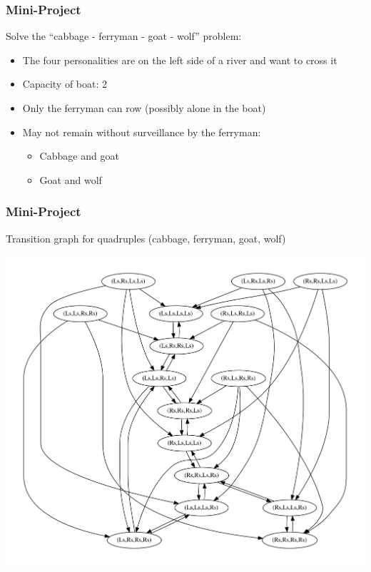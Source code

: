 \begin{frame}[fragile]\frametitle{Mini-Project}

  Solve the ``cabbage - ferryman - goat - wolf'' problem:
  \begin{itemize}
  \item The four personalities are on the left side of a river and want to
    cross it
  \item Capacity of boat: 2
  \item Only the ferryman can row (possibly alone in the boat)
  \item May not remain without surveillance by the ferryman:
    \begin{itemize}
    \item Cabbage and goat
    \item Goat and wolf
    \end{itemize}
  \end{itemize}

\end{frame}

\begin{frame}[fragile]\frametitle{Mini-Project}

  Transition graph for quadruples (cabbage, ferryman, goat, wolf)

  \begin{center}
\includegraphics[scale=0.3]{Figures/river_crossing.pdf}
\end{center}


\end{frame}



